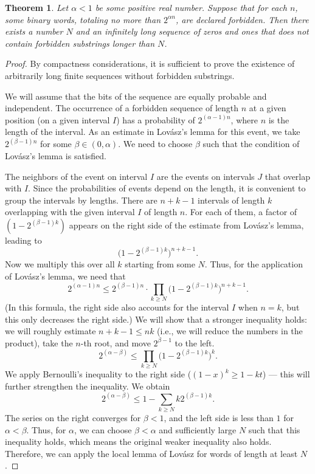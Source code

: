 \documentclass[12pt,sans]{article}
\theoremstyle{definition}
\theoremstyle{plain}
\newtheorem{theorem}{Theorem}[section]
\theoremstyle{remark}
\begin{document}
\begin{theorem}
    Let $\alpha < 1$ be some positive real number.
    Suppose that for each $n$, some binary words, totaling no more than $2^{\alpha n}$,
    are declared forbidden. Then there exists a number $N$ and an infinitely long sequence
    of zeros and ones that does not contain forbidden substrings longer than $N$.
\end{theorem}
\begin{proof}
    By compactness considerations, it is sufficient to prove the existence of arbitrarily long
    finite sequences without forbidden substrings.

    We will assume that the bits of the sequence are equally probable and independent. The occurrence
    of a forbidden sequence of length $n$ at a given position (on a given interval $I$)
    has a probability of $2^{(\alpha - 1)n}$, where $n$ is the length of the interval. As an estimate
    in Lovász's lemma for this event, we take $2^{(\beta - 1)n}$ for some
    $\beta \in (0,\alpha)$. We need to choose $\beta$ such that the condition of Lovász's lemma is satisfied.

    The neighbors of the event on interval $I$ are the events on intervals $J$ that overlap
    with $I$. Since the probabilities of events depend on the length, it is convenient to group
    the intervals by lengths. There are $n+k-1$ intervals of length $k$ overlapping with the given interval $I$
    of length $n$. For each of them, a factor of $(1-2^{(\beta - 1)k})$ appears on the right side of the estimate from Lovász's lemma, leading to
    \[
    \bigl(1-2^{(\beta - 1)k}\bigr)^{n+k-1}.
    \]
    Now we multiply this over all $k$ starting from some $N$. Thus,
    for the application of Lovász's lemma, we need that
    \[
    2^{(\alpha - 1)n} \le 2^{(\beta - 1)n} \cdot \prod_{k \ge N}
    \bigl(1-2^{(\beta - 1)k}\bigr)^{n+k-1}.
    \]
    (In this formula, the right side also accounts for the interval $I$ when $n=k$,
    but this only decreases the right side.) We will show that a stronger inequality holds: we will roughly estimate $n+k - 1 \le nk$ (i.e., we will reduce the numbers in the product),
    take the $n$-th root, and move $2^{\beta - 1}$ to the left.
    \[
    2^{(\alpha - \beta)} \le \prod_{k \ge N} \bigl(1-2^{(\beta - 1)k}\bigr)^k.
    \]
    We apply Bernoulli's inequality to the right side ($(1 - x)^k \ge 1 - kt$) — this will further strengthen the inequality. We obtain
    \[
    2^{(\alpha - \beta)} \le 1 - \sum_{k \ge N} k2^{(\beta - 1)k}.
    \]
    The series on the right converges for $\beta < 1$, and the left side is less than $1$
    for $\alpha < \beta$. Thus, for $\alpha$, we can choose $\beta < \alpha$
    and sufficiently large $N$ such that this inequality holds, which means the original weaker inequality also holds. Therefore, we can apply
    the local lemma of Lovász for words of length at least $N$.


\end{proof}
\end{document}
